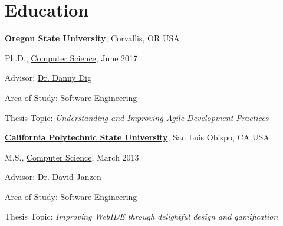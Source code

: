 \documentclass[10pt]{article}
\begin{document}
\vspace{-5pt}

\section{Education}

\href{http://www.oregonstate.edu/}{\textbf{Oregon State University}},  Corvallis, OR USA


\begin{outerlist}

\item[] Ph.D.,
        \href{http://eecs.oregonstate.edu/}
             {Computer Science},
             June 2017
        \begin{innerlist}
        \item Advisor:
              \href{http://dig.cs.illinois.edu/}
                   {Dr. Danny Dig}
        \item Area of Study: Software Engineering 
        \item Thesis Topic: \emph{Understanding and Improving Agile Development Practices}

        \end{innerlist}
\end{outerlist}
\vspace{.5\baselineskip}

        
\href{http://www.calpoly.edu/}{\textbf{California Polytechnic State University}},
San Luis Obispo, CA USA

\begin{outerlist}

\item[] M.S.,
		\vspace{-.2\baselineskip}
        \href{https://www.csc.calpoly.edu/}
             {Computer Science}, March 2013
              \begin{innerlist}
             \item Advisor:
              \href{https://users.csc.calpoly.edu/~djanzen/}
                   {Dr. David Janzen} 
        \item Area of Study: Software Engineering 
        \item Thesis Topic: \emph{Improving WebIDE through delightful design and gamification}
        \end{innerlist}
              
\end{outerlist}
\vspace{.5\baselineskip}
\end{document}
